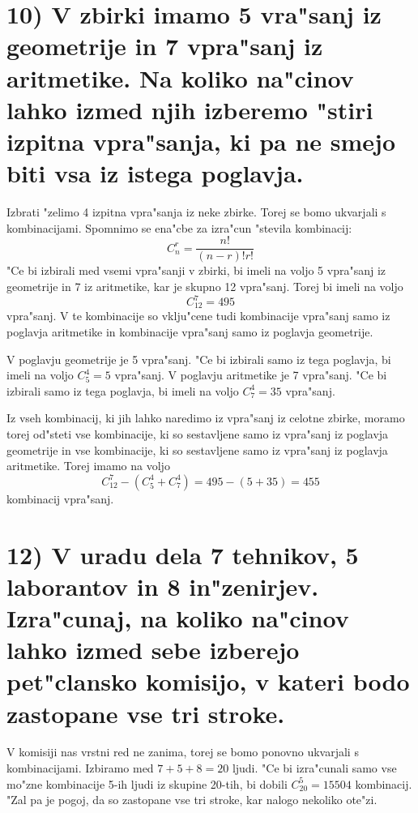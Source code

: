 \documentclass[a4paper, 12pt]{article}
\begin{document}
\section*{10) V zbirki imamo 5 vra"sanj iz geometrije in 7 vpra"sanj iz aritmetike. Na koliko na"cinov lahko izmed njih izberemo "stiri izpitna vpra"sanja, ki pa ne smejo biti vsa iz istega poglavja.}
Izbrati "zelimo 4 izpitna vpra"sanja iz neke zbirke. Torej se bomo ukvarjali s kombinacijami. Spomnimo se ena"cbe za izra"cun "stevila kombinacij:
\begin{equation*}
C_n^r = \dfrac{n!}{(n-r)!r!}
\end{equation*}
"Ce bi izbirali med vsemi vpra"sanji v zbirki, bi imeli na voljo 5 vpra"sanj iz geometrije in 7 iz aritmetike, kar je skupno 12 vpra"sanj. Torej bi imeli na voljo
\begin{equation*}
C_{12}^7 = 495
\end{equation*}
vpra"sanj. V te kombinacije so vklju"cene tudi kombinacije vpra"sanj samo iz poglavja aritmetike in kombinacije vpra"sanj samo iz poglavja geometrije.

V poglavju geometrije je 5 vpra"sanj. "Ce bi izbirali samo iz tega poglavja, bi imeli na voljo $C_5^4 = 5$ vpra"sanj. V poglavju aritmetike je 7 vpra"sanj. "Ce bi izbirali samo iz tega poglavja, bi imeli na voljo $C_7^4 = 35$ vpra"sanj.

Iz vseh kombinacij, ki jih lahko naredimo iz vpra"sanj iz celotne zbirke, moramo torej od"steti vse kombinacije, ki so sestavljene samo iz vpra"sanj iz poglavja geometrije in vse kombinacije, ki so sestavljene samo iz vpra"sanj iz poglavja aritmetike. Torej imamo na voljo
\begin{equation*}
C_{12}^7 - (C_5^4 + C_7^4) = 495 - (5 + 35) = 455
\end{equation*}
kombinacij vpra"sanj.

\section{12) V uradu dela 7 tehnikov, 5 laborantov in 8 in"zenirjev. Izra"cunaj, na koliko na"cinov lahko izmed sebe izberejo pet"clansko komisijo, v kateri bodo zastopane vse tri stroke.}
V komisiji nas vrstni red ne zanima, torej se bomo ponovno ukvarjali s kombinacijami. Izbiramo med $7 + 5 + 8 = 20$ ljudi. "Ce bi izra"cunali samo vse mo"zne kombinacije 5-ih ljudi iz skupine 20-tih, bi dobili $C_{20}^5 = 15504$ kombinacij. "Zal pa je pogoj, da so zastopane vse tri stroke, kar nalogo nekoliko ote"zi.
\end{document}

